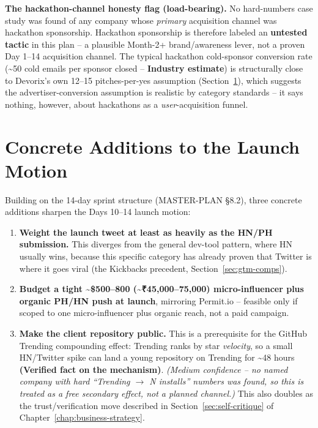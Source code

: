 \textbf{The hackathon-channel honesty flag (load-bearing).} No hard-numbers case study was found of any company whose \emph{primary} acquisition channel was hackathon sponsorship. Hackathon sponsorship is therefore labeled an \textbf{untested tactic} in this plan -- a plausible Month-2+ brand/awareness lever, not a proven Day 1--14 acquisition channel. The typical hackathon cold-sponsor conversion rate (\textasciitilde50 cold emails per sponsor closed -- \textbf{Industry estimate}) is structurally close to Devorix's own 12--15 pitches-per-yes assumption (Section~\ref{sec:gtm-launch-additions}), which suggests the advertiser-conversion assumption is realistic by category standards -- it says nothing, however, about hackathons as a \emph{user}-acquisition funnel.

\section{Concrete Additions to the Launch Motion}
\label{sec:gtm-launch-additions}

Building on the 14-day sprint structure (MASTER-PLAN \S8.2), three concrete additions sharpen the Days 10--14 launch motion:

\begin{enumerate}
  \item \textbf{Weight the launch tweet at least as heavily as the HN/PH submission.} This diverges from the general dev-tool pattern, where HN usually wins, because this specific category has already proven that Twitter is where it goes viral (the Kickbacks precedent, Section~\ref{sec:gtm-comps}).
  \item \textbf{Budget a tight \textasciitilde\$500--800 (\textasciitilde₹45,000--75,000) micro-influencer plus organic PH/HN push at launch}, mirroring Permit.io -- feasible only if scoped to one micro-influencer plus organic reach, not a paid campaign.
  \item \textbf{Make the client repository public.} This is a prerequisite for the GitHub Trending compounding effect: Trending ranks by star \emph{velocity}, so a small HN/Twitter spike can land a young repository on Trending for \textasciitilde48 hours \textbf{(Verified fact on the mechanism)}. \textit{(Medium confidence -- no named company with hard ``Trending $\rightarrow$ N installs'' numbers was found, so this is treated as a free secondary effect, not a planned channel.)} This also doubles as the trust/verification move described in Section~\ref{sec:self-critique} of Chapter~\ref{chap:business-strategy}.
\end{enumerate}

